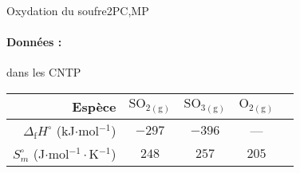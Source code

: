 \begin{exercise}{Oxydation du soufre}{2}{PC,MP}
\begin{questions}
    \paragraph{Données :} dans les CNTP
    \begin{center}
\begin{table}[H]
    \qquad\begin{tabular}{r|cccc}
        Espèce & $\mathrm{SO_{2 (g)}}$ & $\mathrm{SO_{3 (g)}}$ & $\mathrm{O_{2 (g)}}$ \\ \hline\hline
        $\Delta_\text{f}H^\circ$ (kJ$\cdot$mol$^{-1}$) & $-297$ & $-396$ & --- \\
        $S_m^\circ$ (J$\cdot$mol$^{-1}\cdot$K$^{-1}$) & $248$ & $257$ & $205$ \\ \hline
    \end{tabular}
\end{table}
    \end{center}
\end{questions}

\end{exercise}


